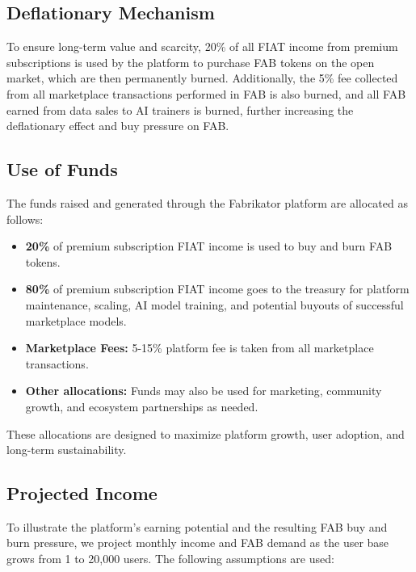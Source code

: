 \subsection*{Deflationary Mechanism}

To ensure long-term value and scarcity, 20\% of all FIAT income from premium subscriptions is used by the platform to purchase FAB tokens on the open market, which are then permanently burned. Additionally, the 5\% fee collected from all marketplace transactions performed in FAB is also burned, and all FAB earned from data sales to AI trainers is burned, further increasing the deflationary effect and buy pressure on FAB.

\subsection*{Use of Funds}
The funds raised and generated through the Fabrikator platform are allocated as follows:
\begin{itemize}[leftmargin=*]
    \item \textbf{20\%} of premium subscription FIAT income is used to buy and burn FAB tokens.
    \item \textbf{80\%} of premium subscription FIAT income goes to the treasury for platform maintenance, scaling, AI model training, and potential buyouts of successful marketplace models.
    \item \textbf{Marketplace Fees:} 5-15\% platform fee is taken from all marketplace transactions.
    \item \textbf{Other allocations:} Funds may also be used for marketing, community growth, and ecosystem partnerships as needed.
\end{itemize}

These allocations are designed to maximize platform growth, user adoption, and long-term sustainability.


\subsection*{Projected Income}

To illustrate the platform's earning potential and the resulting FAB buy and burn pressure, we project monthly income and FAB demand as the user base grows from 1 to 20,000 users. The following assumptions are used:

